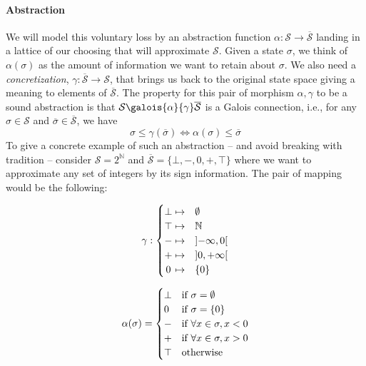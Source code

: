 \documentclass[11pt]{article}
\renewcommand{\S}{\mathcal{S}}
\newcommand{\oS}{\overline{\mathcal{S}}}
\begin{document}
\paragraph{Abstraction} We will model this voluntary loss by an abstraction function $\alpha:\S\to\oS$ landing in a lattice of our choosing that will approximate $\S$. Given a state $\sigma$, we think of $\alpha(\sigma)$ as the amount of information we want to retain about $\sigma$. We also need a \emph{concretization}, $\gamma:\oS\to\S$, that brings us back to the original state space giving a meaning to elements of $\oS$. The property for this pair of morphism $\alpha,\gamma$ to be a sound abstraction is that $\S\galois{\alpha}{\gamma}\oS$ is a Galois connection, i.e., for any $\sigma\in\S$ and $\overline{\sigma}\in\oS$, we have
\[ \sigma \leq \gamma(\overline{\sigma}) \iff \alpha(\sigma) \leq \overline{\sigma} \]
To give a concrete example of such an abstraction -- and avoid breaking with tradition -- consider $\S = 2^{\mathbb{N}}$ and $\oS = \{\bot,-,0,+,\top\}$ where we want to approximate any set of integers by its sign information. The pair of mapping would be the following:

\hfill

\begin{minipage}{0.4\linewidth}
\[
\gamma:
\begin{cases}
\hfill \bot \hfill \mapsto & \emptyset \\
\hfill \top \hfill \mapsto & \mathbb{N} \\
\hfill -   \hfill \mapsto & \left]-\infty,0\right[ \\
\hfill +   \hfill \mapsto & \left]0,+\infty\right[ \\
\hfill 0   \hfill \mapsto & \left\{0\right\} \\
\end{cases}
\]
\end{minipage}
\quad
\begin{minipage}{0.4\linewidth}
\[
\alpha(\sigma) =
\begin{cases}
\bot \hfill & \text{if } \sigma = \emptyset \\
 0   \hfill & \text{if } \sigma = \left\{0\right\} \\
 -   \hfill & \text{if } \forall x\in\sigma, x < 0 \\
 +   \hfill & \text{if } \forall x\in\sigma, x > 0 \\
\top \hfill & \text{otherwise} \\
\end{cases}
\]
\end{minipage}
\end{document}
